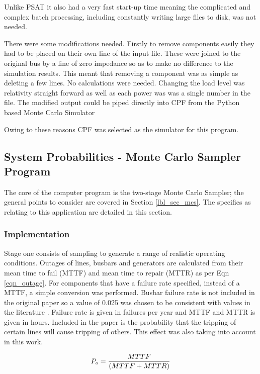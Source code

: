 \documentclass[a4paper,oneside,12pt]{report}
\begin{document}
Unlike PSAT it also had a very fast start-up time meaning the complicated and complex batch processing, including constantly writing large files to disk, was not needed.

There were some modifications needed. Firstly to remove components easily they had to be placed on their own line of the input file. These were joined to the original bus by a line of zero impedance so as to make no difference to the simulation results. This meant that removing a component was as simple as deleting a few lines. No calculations were needed. Changing the load level was relativity straight forward as well as each power was was a single number in the file. The modified output could be piped directly into CPF from the Python based Monte Carlo Simulator 

Owing to these reasons CPF was selected as the simulator for this program.

\subsection{System Probabilities - Monte Carlo Sampler Program}\label{sec_mc_results}

The core of the computer program is the two-stage Monte Carlo Sampler; the general points to consider are covered in Section \ref{lbl_sec_mcs}. The specifics as relating to this application are detailed in this section.

\subsubsection{Implementation}

Stage one consists of sampling to generate a range of realistic operating conditions. Outages of lines, busbars and generators are calculated from their mean time to fail (MTTF) and mean time to repair (MTTR) as per Eqn \ref{eqn_outage}. For components that have a failure rate specified, instead of a MTTF, a simple conversion was performed. Busbar failure rate is not included in the original paper so a value of 0.025 was chosen to be consistent with values in the literature \cite{Allan1991,Billinton1993,Brown2004,Evans1997}. Failure rate is given in failures per year and MTTF and MTTR is given in hours. Included in the paper is the probability that the tripping of certain lines will cause tripping of others. This effect was also taking into account in this work.

\begin{equation}
  \label{eqn_outage}
  P_o = {MTTF \over ( MTTF + MTTR )}
\end{equation}
\end{document}
